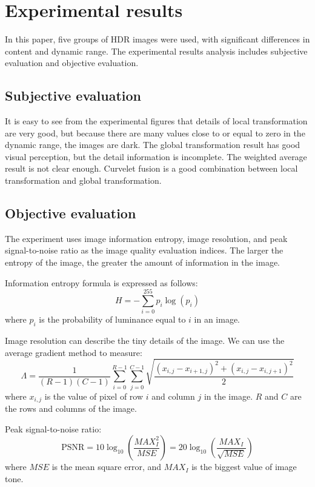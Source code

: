 \documentclass[11pt]{article}
\begin{document}
\section{Experimental results}

In this paper, five groups of HDR images were used, with significant differences in content and dynamic range. The experimental results analysis includes subjective evaluation and objective evaluation.

\subsection{Subjective evaluation}

It is easy to see from the experimental figures that details of local transformation are very good, but because there are many values close to or equal to zero in the dynamic range, the images are dark. The global transformation result has good visual perception, but the detail information is incomplete. The weighted average result is not clear enough. Curvelet fusion is a good combination between local transformation and global transformation.

\subsection{Objective evaluation}

The experiment uses image information entropy, image resolution, and peak signal-to-noise ratio as the image quality evaluation indices. The larger the entropy of the image, the greater the amount of information in the image.

Information entropy formula is expressed as follows:
\begin{equation}
H=-\sum_{i=0}^{255} p_i \log(p_i)
\end{equation}
where $p_i$ is the probability of luminance equal to $i$ in an image.

Image resolution can describe the tiny details of the image. We can use the average gradient method to measure:
\begin{equation}
\Lambda=\frac{1}{(R-1)(C-1)}\sum_{i=0}^{R-1}\sum_{j=0}^{C-1}
\sqrt{\frac{(x_{i,j}-x_{i+1,j})^2+(x_{i,j}-x_{i,j+1})^2}{2}}
\end{equation}
where $x_{i,j}$ is the value of pixel of row $i$ and column $j$ in the image. $R$ and $C$ are the rows and columns of the image.

Peak signal-to-noise ratio:
\begin{equation}
\text{PSNR}=10\log_{10}\left(\frac{MAX_I^2}{MSE}\right)
=20\log_{10}\left(\frac{MAX_I}{\sqrt{MSE}}\right)
\end{equation}
where $MSE$ is the mean square error, and $MAX_I$ is the biggest value of image tone.
\end{document}
